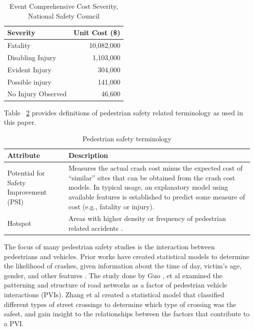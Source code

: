 \documentclass{llncs}
\begin{document}
%
\FloatBarrier
\begin{table}[!h]
\begin{center}
\caption{Event Comprehensive Cost Severity, National Safety Council}
\label{table:eventseverity}
\begin{tabular}{lr}
\hline
\rule{0pt}{12pt}
Severity & Unit Cost (\$)\\[2pt]
\hline
Fatality 			&10,082,000\\
Disabling Injury 		&1,103,000\\
Evident Injury 		&304,000\\
Possible injury 		&141,000\\
No Injury Observed		&46,600\\[2pt]
\hline
\end{tabular}
\end{center}
\end{table}
\FloatBarrier
%
Table ~\ref{table:terminology} provides definitions of  pedestrian safety related terminology as used in this paper.
%
\FloatBarrier
\begin{table}[!ht]
\caption{Pedestrian safety terminology}
\label{table:terminology}
\begin{center}
\begin{tabular}{ p{}  p{} }
\hline
\rule{0pt}{12pt}
Attribute & Description\\[2pt]
\hline
Potential for Safety Improvement (PSI)	&	Measures the actual crash cost minus the expected cost of “similar” sites that can be obtained from the crash cost models. In typical usage, an explanatory model using available features is established to predict some measure of cost (e.g., fatality or injury). \cite{ohgov2017} \\		
Hotspot & Areas with higher density or frequency of pedestrian related accidents \cite{xie2017analysis}. 	\\	[2pt]
\hline
\end{tabular}
\end{center}	
\end{table}
\FloatBarrier	

The focus of many pedestrian safety studies is the interaction between pedestrians and vehicles. Prior works have created statistical models to determine the likelihood of crashes, given information about the time of day, victim's age, gender, and other features \cite{brude1993models} \cite{lascala2000demographic} \cite{lyon2002pedestrian} \cite{ladron2004forecasting} \cite{pulugurtha2011pedestrian} \cite{ukkusuri2011random}. The study done by Guo \cite{guo2017effect}, et al examined the patterning and structure of road networks as a factor of pedestrian vehicle interactions (PVIs). Zhang et al \cite{zhang2017quantitative} created a statistical model that classified different types of street crossings to determine which type of crossing was the safest, and gain insight to the relationships between the factors that contribute to a PVI. 
\end{document}
